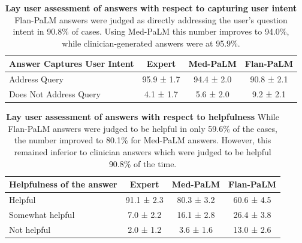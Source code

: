 \begin{table}[]
\small
\centering
\caption{\textbf{Lay user assessment of  answers with respect to capturing user intent}  Flan-PaLM answers were judged as directly addressing the user’s question intent in 90.8\% of cases. Using Med-PaLM this number improves to 94.0\%, while clinician-generated answers were at 95.9\%.}
\vspace{3pt}
\label{tab:detailed-lay-task1}
\begin{tabular}{l|ccc}
\toprule
\textbf{Answer Captures User Intent} & \textbf{Expert} & \textbf{Med-PaLM} & \textbf{Flan-PaLM} \\ \hline
Address Query                        & 95.9 ± 1.7      & 94.4 ± 2.0        & 90.8 ± 2.1         \\ \hline
Does Not Address Query               & 4.1 ± 1.7       & 5.6 ± 2.0         & 9.2 ± 2.1         \\ \bottomrule
\end{tabular}
\end{table}


\begin{table}[]
\small
\centering
\caption{\textbf{Lay user assessment of  answers with respect to helpfulness} While Flan-PaLM answers were judged to be helpful in only 59.6\% of the cases, the number improved to 80.1\% for Med-PaLM answers. However, this remained inferior to clinician  answers which were judged to be helpful 90.8\% of the time.}
\vspace{3pt}
\label{tab:detailed-lay-task2}
\begin{tabular}{l|ccc}
\toprule
\textbf{Helpfulness of the answer} & \textbf{Expert} & \textbf{Med-PaLM} & \textbf{Flan-PaLM} \\ \hline
Helpful          & 91.1 ± 2.3 & 80.3 ± 3.2 & 60.6 ± 4.5 \\
Somewhat helpful & 7.0 ± 2.2  & 16.1 ± 2.8 & 26.4 ± 3.8 \\
Not helpful      & 2.0 ± 1.2  & 3.6 ± 1.6  & 13.0 ± 2.6 \\ \bottomrule
\end{tabular}
\end{table}








